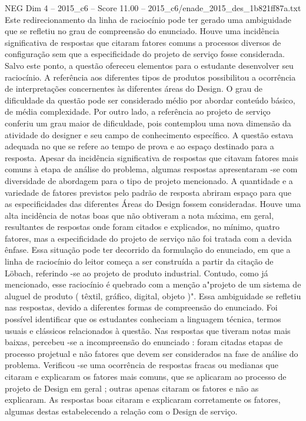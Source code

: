 \begin{textsample}{NEG Dim 4 – 2015\_c6 – Score 11.00 – 2015\_c6/enade\_2015\_des\_1b821ff87a.txt}
Este redirecionamento da linha de raciocínio pode ter gerado uma ambiguidade que se refletiu no grau de compreensão do enunciado.
Houve uma incidência significativa de respostas que citaram fatores comuns a processos diversos de configuração sem que a especificidade do projeto de serviço fosse considerada.
Salvo este ponto, a questão ofereceu elementos para o estudante desenvolver seu raciocínio.
A referência aos diferentes tipos de produtos possibilitou a ocorrência de interpretações concernentes às diferentes áreas do Design.
O grau de dificuldade da questão pode ser considerado médio por abordar conteúdo básico, de média complexidade.
Por outro lado, a referência ao projeto de serviço conferiu um grau maior de dificuldade, pois contemplou uma nova dimensão da atividade do designer e seu campo de conhecimento específico.
A questão estava adequada no que se refere ao tempo de prova e ao espaço destinado para a resposta.
Apesar da incidência significativa de respostas que citavam fatores mais comuns à etapa de análise do problema, algumas respostas apresentaram -se com diversidade de abordagem para o tipo de projeto mencionado.
A quantidade e a variedade de fatores previstos pelo padrão de resposta abriram espaço para que as especificidades das diferentes Áreas do Design fossem consideradas.
Houve uma alta incidência de notas boas que não obtiveram a nota máxima, em geral, resultantes de respostas onde foram citados e explicados, no mínimo, quatro fatores, mas a especificidade do projeto de serviço não foi tratada com a devida ênfase.
Essa situação pode ter decorrido da formulação do enunciado, em que a linha de raciocínio do leitor começa a ser construída a partir da citação de Löbach, referindo -se ao projeto de produto industrial.
Contudo, como já mencionado, esse raciocínio é quebrado com a menção a"projeto de um sistema de aluguel de produto ( têxtil, gráfico, digital, objeto )".
Essa ambiguidade se refletiu nas respostas, devido a diferentes formas de compreensão do enunciado.
Foi possível identificar que os estudantes conheciam a linguagem técnica, termos usuais e clássicos relacionados à questão.
Nas respostas que tiveram notas mais baixas, percebeu -se a incompreensão do enunciado : foram citadas etapas de processo projetual e não fatores que devem ser considerados na fase de análise do problema.
Verificou -se uma ocorrência de respostas fracas ou medianas que citaram e explicaram os fatores mais comuns, que se aplicaram ao processo de projeto de Design em geral ; outras apenas citaram os fatores e não as explicaram.
As respostas boas citaram e explicaram corretamente os fatores, algumas destas estabelecendo a relação com o Design de serviço.

\end{textsample}
